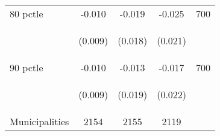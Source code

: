 \begin{tabular}{lcccc}
80 pctle   &  -0.010    &   -0.019    &     -0.025  &  700  \\

\vspace{4pt} &  \begin{footnotesize}(0.009)\end{footnotesize}   &
			    \begin{footnotesize}(0.018)\end{footnotesize}   &
			    \begin{footnotesize}(0.021)\end{footnotesize}   &
			     \\          



90 pctle  &  -0.010    &   -0.013    &     -0.017  &  700  \\

\vspace{4pt} &  \begin{footnotesize}(0.009)\end{footnotesize}   &
			    \begin{footnotesize}(0.019)\end{footnotesize}   &
			    \begin{footnotesize}(0.022)\end{footnotesize}   &
			     \\          

Municipalities   &   2154   &    2155     &  2119    \\
\hline	


\end{tabular}%
